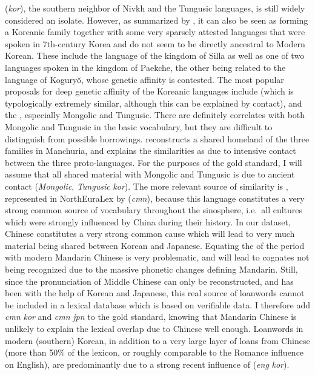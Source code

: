  (\textit{kor}), the southern neighbor of Nivkh and the Tungusic languages, is still widely considered an isolate. However, as summarized by \cite{beckwith2005}, it can also be seen as forming a Koreanic family together with some very sparsely attested languages that were spoken in 7th-century Korea and do not seem to be directly ancestral to Modern Korean. These include the language of the kingdom of Silla as well as one of two languages spoken in the kingdom of Paekche, the other being related to the language of Koguryŏ, whose genetic affinity is contested. The most popular proposals for deep genetic affinity of the Koreanic languages include  (which is typologically extremely similar, although this can be explained by contact), and the , especially Mongolic and Tungusic. There are definitely correlates with both Mongolic and Tungusic in the basic vocabulary, but they are difficult to distinguish from possible 
borrowings. \cite{janhunen1996} reconstructs a shared homeland of the three families in Manchuria, and explains the similarities as due to intensive contact between the three proto-languages. For the purposes of the gold standard, I will assume that all shared material with Mongolic and Tungusic is due to ancient contact (\textit{Mongolic}, \textit{Tungusic} \arrowLA \textit{kor}). The more relevant source of similarity is , represented in NorthEuraLex by  (\textit{cmn}), because this language constitutes a very strong common source of vocabulary throughout the sinosphere, i.e.\ all cultures which were strongly influenced by China during their history. In our dataset, Chinese constitutes a very strong common cause which will lead to very much material being shared between Korean and Japanese. Equating the  of the period with modern Mandarin Chinese is very problematic, and will lead to cognates not being recognized due to the massive phonetic changes 
defining Mandarin. Still, since the pronunciation of Middle Chinese can only be reconstructed, and has been with the help of Korean and Japanese, this real source of loanwords cannot be included in a lexical database which is based on verifiable data. I therefore add \textit{cmn} \arrowLA \textit{kor} and \textit{cmn} \arrowLA \textit{jpn} to the gold standard, knowing that Mandarin Chinese is unlikely to explain the lexical overlap due to Chinese well enough. Loanwords in modern (southern) Korean, in addition to a very large layer of loans from Chinese (more than 50\% of the lexicon, or roughly comparable to the Romance influence on English), are predominantly due to a strong recent influence of  (\textit{eng} \arrowLA \textit{kor}).

